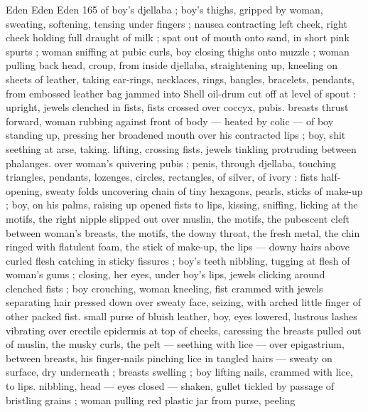 Eden Eden Eden 165
of boy's djellaba ; boy's thighs, gripped by woman, sweating,
softening, tensing under fingers ; nausea contracting left cheek, right
cheek holding full draught of milk ; spat out of mouth onto sand, in
short pink spurts ; woman sniffing at pubic curls, boy closing thighs
onto muzzle ; woman pulling back head, croup, from inside djellaba,
straightening up, kneeling on sheets of leather, taking ear-rings,
necklaces, rings, bangles, bracelets, pendants, from embossed
leather bag jammed into Shell oil-drum cut off at level of spout :
upright, jewels clenched in fists, fists crossed over coccyx, pubis.
breasts thrust forward, woman rubbing against front of body —
heated by colic — of boy standing up, pressing her broadened
mouth over his contracted lips ; boy, shit seething at arse, taking.
lifting, crossing fists, jewels tinkling protruding between phalanges.
over woman's quivering pubis ; penis, through djellaba, touching
triangles, pendants, lozenges, circles, rectangles, of silver, of ivory :
fists half-opening, sweaty folds uncovering chain of tiny hexagons,
pearls, sticks of make-up ; boy, on his palms, raising up opened fists
to lips, kissing, sniffing, licking at the motifs, the right nipple slipped
out over muslin, the motifs, the pubescent cleft between woman's
breasts, the motifs, the downy throat, the fresh metal, the chin ringed
with flatulent foam, the stick of make-up, the lips — downy hairs
above curled flesh catching in sticky fissures ; boy's teeth nibbling,
tugging at flesh of woman's gums ; closing, her eyes, under boy's
lips, jewels clicking around clenched fists ; boy crouching, woman
kneeling, fist crammed with jewels separating hair pressed down over
sweaty face, seizing, with arched little finger of other packed fist.
small purse of bluish leather, boy, eyes lowered, lustrous lashes
vibrating over erectile epidermis at top of cheeks, caressing the
breasts pulled out of muslin, the musky curls, the pelt — seething
with lice — over epigastrium, between breasts, his finger-nails
pinching lice in tangled hairs — sweaty on surface, dry underneath
; breasts swelling ; boy lifting nails, crammed with lice, to lips.
nibbling, head — eyes closed — shaken, gullet tickled by passage
of bristling grains ; woman pulling red plastic jar from purse, peeling

